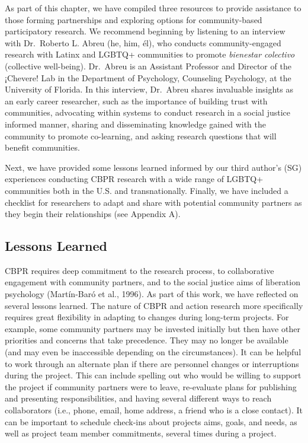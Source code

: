 \documentclass[
  11pt,
]{book}
\begin{document}
As part of this chapter, we have compiled three resources to provide assistance to those forming partnerships and exploring options for community-based participatory research. We recommend beginning by listening to an interview with Dr.~Roberto L. Abreu (he, him, él), who conducts community-engaged research with Latinx and LGBTQ+ communities to promote \emph{bienestar colectivo} (collective well-being). Dr.~Abreu is an Assistant Professor and Director of the ¡Chevere! Lab in the Department of Psychology, Counseling Psychology, at the University of Florida. In this interview, Dr.~Abreu shares invaluable insights as an early career researcher, such as the importance of building trust with communities, advocating within systems to conduct research in a social justice informed manner, sharing and disseminating knowledge gained with the community to promote co-learning, and asking research questions that will benefit communities.

Next, we have provided some lessons learned informed by our third author's (SG) experiences conducting CBPR research with a wide range of LGBTQ+ communities both in the U.S. and transnationally. Finally, we have included a checklist for researchers to adapt and share with potential community partners as they begin their relationships (see Appendix A).

\hypertarget{lessons-learned}{%
\subsection{Lessons Learned}\label{lessons-learned}}

CBPR requires deep commitment to the research process, to collaborative engagement with community partners, and to the social justice aims of liberation psychology (Martín-Baró et al., 1996). As part of this work, we have reflected on several lessons learned. The nature of CBPR and action research more specifically requires great flexibility in adapting to changes during long-term projects. For example, some community partners may be invested initially but then have other priorities and concerns that take precedence. They may no longer be available (and may even be inaccessible depending on the circumstances). It can be helpful to work through an alternate plan if there are personnel changes or interruptions during the project. This can include spelling out who would be willing to support the project if community partners were to leave, re-evaluate plans for publishing and presenting responsibilities, and having several different ways to reach collaborators (i.e., phone, email, home address, a friend who is a close contact). It can be important to schedule check-ins about projects aims, goals, and needs, as well as project team member commitments, several times during a project.
\end{document}

